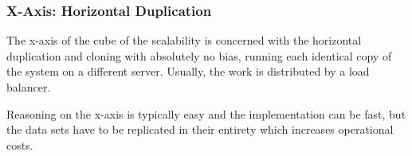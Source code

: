 \subsubsection{X-Axis: Horizontal Duplication}

The x-axis of the cube of the scalability is concerned with the horizontal
duplication and cloning with absolutely no bias, running each identical copy of
the system on a different server. Usually, the work is distributed by a load
balancer.

Reasoning on the x-axis is typically easy and the implementation can be fast,
but the data sets have to be replicated in their entirety which increases
operational costs.
